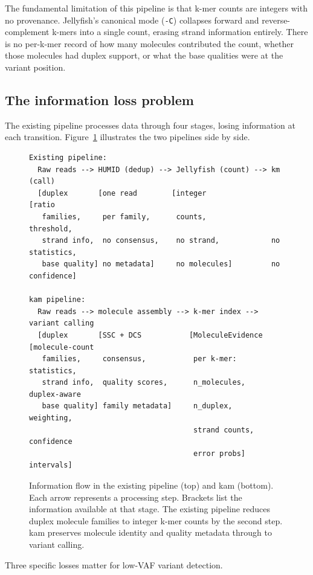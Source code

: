 The fundamental limitation of this pipeline is that k-mer counts are integers with no provenance.
Jellyfish's canonical mode (\texttt{-C}) collapses forward and reverse-complement k-mers into a single count, erasing strand information entirely.
There is no per-k-mer record of how many molecules contributed the count, whether those molecules had duplex support, or what the base qualities were at the variant position.

\subsection{The information loss problem}
\label{sec:bg-information-loss}

The existing pipeline processes data through four stages, losing information at each transition.
Figure~\ref{fig:info-loss} illustrates the two pipelines side by side.

\begin{figure}[htbp]
\centering
\small
\begin{verbatim}
Existing pipeline:
  Raw reads --> HUMID (dedup) --> Jellyfish (count) --> km (call)
  [duplex       [one read        [integer              [ratio
   families,     per family,      counts,               threshold,
   strand info,  no consensus,    no strand,            no statistics,
   base quality] no metadata]     no molecules]         no confidence]

kam pipeline:
  Raw reads --> molecule assembly --> k-mer index --> variant calling
  [duplex       [SSC + DCS           [MoleculeEvidence  [molecule-count
   families,     consensus,           per k-mer:          statistics,
   strand info,  quality scores,      n_molecules,        duplex-aware
   base quality] family metadata]     n_duplex,           weighting,
                                      strand counts,      confidence
                                      error probs]        intervals]
\end{verbatim}
\caption{Information flow in the existing pipeline (top) and kam (bottom).
Each arrow represents a processing step.
Brackets list the information available at that stage.
The existing pipeline reduces duplex molecule families to integer k-mer counts by the second step.
kam preserves molecule identity and quality metadata through to variant calling.}
\label{fig:info-loss}
\end{figure}

Three specific losses matter for low-VAF variant detection.

